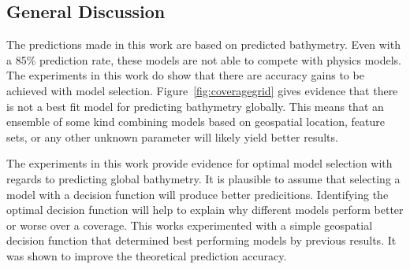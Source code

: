
\subsection{General Discussion}
The predictions made in this work are based on predicted bathymetry.
Even with a 85\% prediction rate, these models are not able to compete with physics models.
The experiments in this work do show that there are accuracy gains to be achieved with model selection.
Figure~\ref{fig:coveragegrid} gives evidence that there is not a best fit model for predicting bathymetry globally.
This means that an ensemble of some kind combining models based on geospatial location, feature sets, or any other unknown parameter will likely yield better results.

The experiments in this work provide evidence for optimal model selection with regards to predicting global bathymetry.
It is plausible to assume that selecting a model with a decision function will produce better predicitions.
Identifying the optimal decision function will help to explain why different models perform better or worse over a coverage.
This works experimented with a simple geospatial decision function that determined best performing models by previous results.
It was shown to improve the theoretical prediction accuracy.
